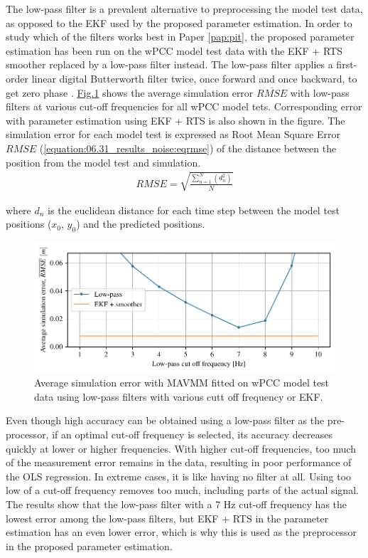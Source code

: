 The low-pass filter is a prevalent alternative to preprocessing the model test data, as opposed to the EKF used by the proposed parameter estimation.
In order to study which of the filters works best in Paper \ref{pap:pit}, the proposed parameter estimation has been run on the wPCC model test data with the EKF + RTS smoother replaced by a low-pass filter instead. The low-pass filter applies a first-order linear digital Butterworth filter twice, once forward and once backward, to get zero phase \cite{virtanen_scipy_2020}. \hyperref[\detokenize{06.31_results_noise:fig-lowpass-accuracy}]{Fig.\@ \ref{\detokenize{06.31_results_noise:fig-lowpass-accuracy}}} shows the average simulation error \( \overline{RMSE} \) with low-pass filters at various cut-off frequencies for all wPCC model tets. Corresponding error with parameter estimation using EKF + RTS is also shown in the figure. The simulation error for each model test is expressed as Root Mean Square Error \(RMSE\) (\autoref{equation:06.31_results_noise:eqrmse}) of the distance between the position from the model test and simulation.
\begin{equation}\label{equation:06.31_results_noise:eqrmse}
\begin{split}RMSE=\sqrt{ \frac{\sum_{n=1}^{N} (d_n^2) }{N}} \end{split}
\end{equation}

\noindent where \(d_n\) is the euclidean distance for each time step between the model test positions (\(x_0\), \(y_0\)) and the predicted positions.

\begin{figure}[!htb]
\centering
\includegraphics{kappa/images/6.pdf}
\caption{Average simulation error with MAVMM fitted on wPCC model test data using low-pass filters with various cutt off frequency or EKF.}\label{\detokenize{06.31_results_noise:fig-lowpass-accuracy}}\end{figure} 
\noindent Even though high accuracy can be obtained using a low-pass filter as the pre-processor, if an optimal cut-off frequency is selected, its accuracy decreases quickly at lower or higher frequencies. With higher cut-off frequencies, too much of the measurement error remains in the data, resulting in poor performance of the OLS regression. In extreme cases, it is like having no filter at all. Using too low of a cut-off frequency removes too much, including parts of the actual signal. The results show that the low-pass filter with a 7 Hz cut-off frequency has the lowest error among the low-pass filters, but EKF + RTS in the parameter estimation has an even lower error, which is why this is used as the preprocessor in the proposed parameter estimation.
